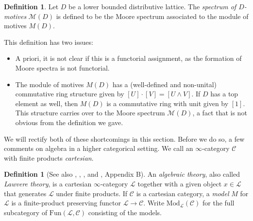 \documentclass[10pt]{amsart}
\theoremstyle{definition}
\newtheorem{definition}[theorem]{Definition}
\newcommand{\Fun}{\text{Fun}}
\begin{document}
\begin{definition}
Let $D$ be a lower bounded distributive lattice. The \emph{spectrum of $D$-motives} $\mathcal{M}(D)$ is defined to be the  Moore spectrum associated to the module of motives $M(D)$.
\end{definition}
This definition has two issues:
\begin{itemize}
\item A priori, it is not clear if this is a functorial assignment, as the formation of Moore spectra is not functorial.
\item The module of motives $M(D)$ has a (well-defined and non-unital) commutative ring structure given by $[U] \cdot [V] = [U \wedge V]$. If $D$ has a top element as well, then $M(D)$ is a commutative ring with unit given by $[1]$. This structure carries over to the Moore spectrum $\mathcal{M}(D)$, a fact that is not obvious from the definition we gave.
\end{itemize}
We will rectify both of these shortcomings in this section. Before we do so, a few comments on algebra in a higher categorical setting. We call an $\infty$-category $\mathcal{C}$ with finite products \emph{cartesian}.

\begin{definition}[See also \cite{joyal2008}, \cite{cranch2010algebraic}, \cite{berman2019higher}, and \cite{Gepner_2015}, Appendix B]
An \emph{algebraic theory}, also called \emph{Lawvere theory}, is a cartesian $\infty$-category $\mathcal{L}$ together with a given object $x \in \mathcal{L}$ that generates $\mathcal{L}$ under finite products. If $\mathcal{C}$ is a cartesian category, a \emph{model} $M$ for $\mathcal{L}$ is a finite-product preserving functor $\mathcal{L} \rightarrow \mathcal{C}$. Write $\text{Mod}_\mathcal{L}(\mathcal{C})$ for the full subcategory of $\Fun(\mathcal{L}, \mathcal{C})$ consisting of the models.
\end{definition}
\end{document}
